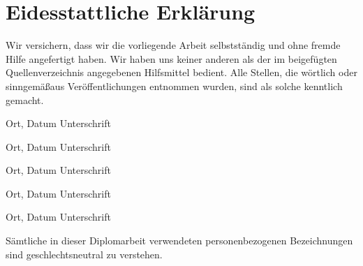 \chapter*{Eidesstattliche Erkl\"arung}
Wir versichern, dass wir die vorliegende Arbeit selbstst\"andig und ohne fremde Hilfe angefertigt haben. Wir haben uns keiner anderen als der im beigef\"ugten Quellenverzeichnis angegebenen Hilfsmittel bedient. Alle Stellen, die w\"ortlich oder sinngem\"a\ss aus Ver\"offentlichungen entnommen wurden, sind als solche kenntlich gemacht.

\vspace{1cm}

\hspace{1.5cm} Ort, Datum \hfill Unterschrift \hspace{1.5cm}

\vspace{1.2cm}

\hspace{1.5cm} Ort, Datum \hfill Unterschrift \hspace{1.5cm}

\vspace{1.2cm}

\hspace{1.5cm} Ort, Datum \hfill Unterschrift \hspace{1.5cm}

\vspace{1.2cm}

\hspace{1.5cm} Ort, Datum \hfill Unterschrift \hspace{1.5cm}

\vspace{1.2cm}

\hspace{1.5cm} Ort, Datum \hfill Unterschrift \hspace{1.5cm}

\vspace{1.2cm}

\begin{center}
S\"amtliche in dieser Diplomarbeit verwendeten personenbezogenen Bezeichnungen sind geschlechtsneutral zu verstehen.
\end{center}